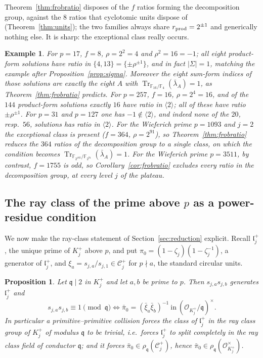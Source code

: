 \documentclass[a4paper]{article}
\newtheorem{proposition}[theorem]{Proposition}
\newtheorem{example}[theorem]{Example}
\newcommand{\F}{\mathbb{F}}
\newcommand{\abs}[1]{\left|#1\right|}
\DeclareMathOperator{\Tr}{Tr}
\begin{document}
Theorem~\ref{thm:frobratio} disposes of the $f$ ratios forming the
decomposition group, against the $8$ ratios that cyclotomic units dispose of
(Theorem~\ref{thm:units}); the two families always share
$r_{\rm prod}=2^{\pm1}$ and generically nothing else.
It is sharp: the exceptional class really occurs.

\begin{example}\label{ex:17-257}
	For $p=17$, $f=8$, $\rho=2^{2}=4$ and $\rho^{2}=16=-1$; all eight
	product-form solutions have ratio in $\{4,13\}=\{\pm\rho^{\pm1}\}$, and
	in fact $\abs{\Sigma}=1$, matching the example after
	Proposition~\ref{prop:sigma}.
	Moreover the eight sum-form indices of those solutions are exactly the
	eight $A$ with $\Tr_{\F_{16}/\F_{4}}(\bar\lambda_A)=1$, as
	Theorem~\ref{thm:frobratio} predicts.
	For $p=257$, $f=16$, $\rho=2^{4}=16$, and of the $144$ product-form
	solutions exactly $16$ have ratio in $\langle2\rangle$; all of these
	have ratio $\pm\rho^{\pm1}$.
	For $p=31$ and $p=127$ one has $-1\notin\langle2\rangle$, and indeed
	none of the $20$, resp.\ $56$, solutions has ratio in $\langle2\rangle$.
	For the Wieferich prime $p=1093$ and $j=2$ the exceptional class is
	present ($f=364$, $\rho=2^{91}$), so Theorem~\ref{thm:frobratio}
	reduces the $364$ ratios of the decomposition group to a single class,
	on which the condition becomes
	$\Tr_{\F_{2^{182}}/\F_{2^{91}}}(\bar\lambda_A)=1$.
	For the Wieferich prime $p=3511$, by contrast, $f=1755$ is odd, so
	Corollary~\ref{cor:frobratio} excludes \emph{every} ratio in the
	decomposition group, at every level $j$ of the plateau.
\end{example}

\subsection{The ray class of the prime above $p$ as a power-residue
condition}

We now make the ray-class statement of Section~\ref{sec:reduction}
explicit.  Recall $\mathfrak l_j^{+}$, the unique prime of $K_j^{+}$ above
$p$, and put $\pi_0=(1-\zeta_j)(1-\zeta_j^{-1})$, a generator of
$\mathfrak l_j^{+}$, and $\xi_a=s_{j,a}/s_{j,1}\in\mathcal C_j^{+}$ for
$p\nmid a$, the standard circular units.

\begin{proposition}\label{prop:rayclass}
	Let $\mathfrak q\mid2$ in $K_j^{+}$ and let $a,b$ be prime to $p$.
	Then $s_{j,a}s_{j,b}$ generates $\mathfrak l_j^{+}$ and
	\[
		s_{j,a}s_{j,b}\equiv1\pmod{\mathfrak q}
		\iff
		\bar\pi_0=\left(\bar\xi_a\bar\xi_b\right)^{-1}
		\ \text{in}\ (\mathcal O_{K_j^{+}}/\mathfrak q)^{\times}.
	\]
	In particular a primitive--primitive collision forces the class of
	$\mathfrak l_j^{+}$ in the ray class group of $K_j^{+}$ of modulus
	$\mathfrak q$ to be trivial, i.e.\ forces $\mathfrak l_j^{+}$ to split
	completely in the ray class field of conductor $\mathfrak q$; and it
	forces $\bar\pi_0\in\rho_{\mathfrak q}(\mathcal C_j^{+})$, hence
	$\bar\pi_0\in\rho_{\mathfrak q}(\mathcal O_{K_j^{+}}^{\times})$.
\end{proposition}
\end{document}
